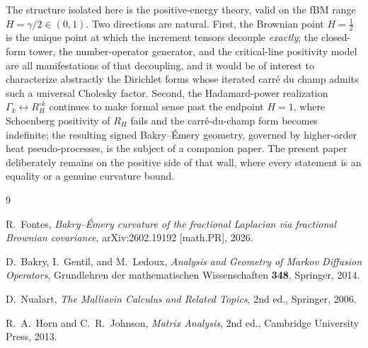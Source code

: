 \documentclass[11pt,reqno]{amsart}
\theoremstyle{plain}
\theoremstyle{definition}
\newcommand{\Had}{\mathbin{\circ}}     %
\newcommand{\Gam}{\Gamma}
\begin{document}
The structure isolated here is the positive-energy theory, valid on the fBM
range $H=\gamma/2\in(0,1)$. Two directions are natural. First, the Brownian point
$H=\tfrac12$ is the unique point at which the increment tensors decouple
\emph{exactly}; the closed-form tower, the number-operator generator, and the
critical-line positivity model are all manifestations of that decoupling, and it
would be of interest to characterize abstractly the Dirichlet forms whose
iterated carr\'e du champ admits such a universal Cholesky factor. Second, the
Hadamard-power realization $\Gam_k\leftrightarrow R_H^{\Had k}$ continues to make
formal sense past the endpoint $H=1$, where Schoenberg positivity of $R_H$ fails
and the carr\'e-du-champ form becomes indefinite; the resulting signed
Bakry--\'Emery geometry, governed by higher-order heat pseudo-processes, is the
subject of a companion paper. The present paper deliberately remains on the
positive side of that wall, where every statement is an equality or a genuine
curvature bound.

\begin{thebibliography}{9}

R.~Fontes,
\emph{Bakry--\'Emery curvature of the fractional Laplacian via fractional
Brownian covariance},
arXiv:2602.19192 [math.PR], 2026.

D.~Bakry, I.~Gentil, and M.~Ledoux,
\emph{Analysis and Geometry of Markov Diffusion Operators},
Grundlehren der mathematischen Wissenschaften \textbf{348}, Springer, 2014.

D.~Nualart,
\emph{The Malliavin Calculus and Related Topics}, 2nd ed.,
Springer, 2006.

R.~A.~Horn and C.~R.~Johnson,
\emph{Matrix Analysis}, 2nd ed.,
Cambridge University Press, 2013.

\end{thebibliography}
\end{document}
